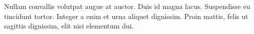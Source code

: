 \documentclass{report}
\begin{document}
Nullam convallis \cite{Florindo2010} volutpat augue at auctor. Duis id magna lacus. Suspendisse eu tincidunt tortor. Integer a enim et urna aliquet dignissim. Proin mattis, felis ut sagittis dignissim, \cite{Mokhtarian1997} elit nisi elementum dui.

%


\end{document}
